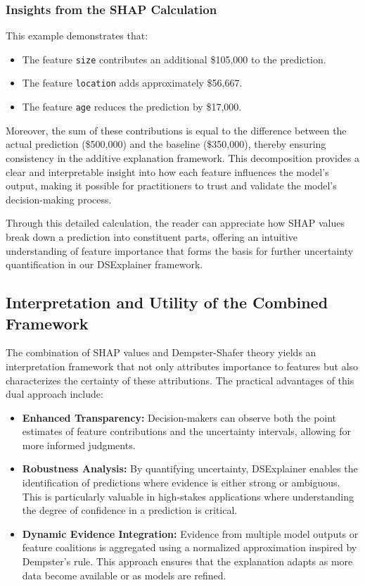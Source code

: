 \documentclass[acmlarge]{acmart}
\begin{document}
\subsubsection{Insights from the SHAP Calculation}

This example demonstrates that:
\begin{itemize}
    \item The feature \texttt{size} contributes an additional \$105,000 to the prediction.
    \item The feature \texttt{location} adds approximately \$56,667.
    \item The feature \texttt{age} reduces the prediction by \$17,000.
\end{itemize}

Moreover, the sum of these contributions is equal to the difference between the actual prediction (\$500,000) and the baseline (\$350,000), thereby ensuring consistency in the additive explanation framework. This decomposition provides a clear and interpretable insight into how each feature influences the model’s output, making it possible for practitioners to trust and validate the model’s decision-making process.

Through this detailed calculation, the reader can appreciate how SHAP values break down a prediction into constituent parts, offering an intuitive understanding of feature importance that forms the basis for further uncertainty quantification in our DSExplainer framework.


\subsection{Interpretation and Utility of the Combined Framework}

The combination of SHAP values and Dempster-Shafer theory yields an interpretation framework that not only attributes importance to features but also characterizes the certainty of these attributions. The practical advantages of this dual approach include:
\begin{itemize}
    \item \textbf{Enhanced Transparency:}  
    Decision-makers can observe both the point estimates of feature contributions and the uncertainty intervals, allowing for more informed judgments.
    \item \textbf{Robustness Analysis:}  
    By quantifying uncertainty, DSExplainer enables the identification of predictions where evidence is either strong or ambiguous. This is particularly valuable in high-stakes applications where understanding the degree of confidence in a prediction is critical.
    \item \textbf{Dynamic Evidence Integration:}
    Evidence from multiple model outputs or feature coalitions is aggregated using a normalized approximation inspired by Dempster's rule. This approach ensures that the explanation adapts as more data become available or as models are refined.
\end{itemize}
\end{document}
